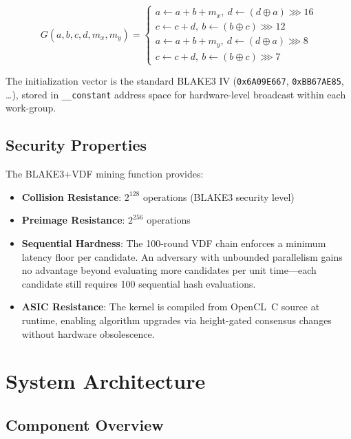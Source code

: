 \documentclass[11pt,a4paper]{article}
\begin{document}
\begin{equation}
    G(a, b, c, d, m_x, m_y) = \begin{cases}
        a \leftarrow a + b + m_x,\ d \leftarrow (d \oplus a) \ggg 16 \\
        c \leftarrow c + d,\ b \leftarrow (b \oplus c) \ggg 12 \\
        a \leftarrow a + b + m_y,\ d \leftarrow (d \oplus a) \ggg 8 \\
        c \leftarrow c + d,\ b \leftarrow (b \oplus c) \ggg 7
    \end{cases}
\end{equation}

The initialization vector is the standard BLAKE3 IV (\texttt{0x6A09E667}, \texttt{0xBB67AE85}, \ldots), stored in \texttt{\_\_constant} address space for hardware-level broadcast within each work-group.

\subsection{Security Properties}

The BLAKE3+VDF mining function provides:

\begin{itemize}
    \item \textbf{Collision Resistance}: $2^{128}$ operations (BLAKE3 security level)
    \item \textbf{Preimage Resistance}: $2^{256}$ operations
    \item \textbf{Sequential Hardness}: The 100-round VDF chain enforces a minimum latency floor per candidate. An adversary with unbounded parallelism gains no advantage beyond evaluating more candidates per unit time---each candidate still requires 100 sequential hash evaluations.
    \item \textbf{ASIC Resistance}: The kernel is compiled from OpenCL~C source at runtime, enabling algorithm upgrades via height-gated consensus changes without hardware obsolescence.
\end{itemize}

\section{System Architecture}

\subsection{Component Overview}
\end{document}

